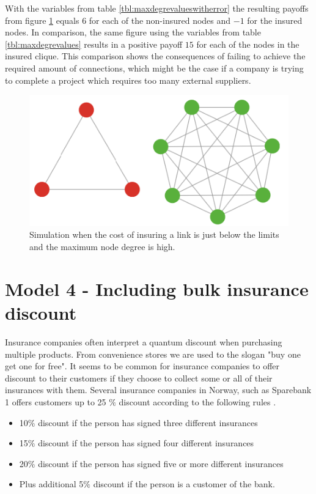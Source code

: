 With the variables from table \ref{tbl:maxdegrevalueswitherror} the resulting payoffs from figure \ref{fig:bonusviolatingWithErrors} equals $6$ for each of the non-insured nodes and $-1$ for the insured nodes. In comparison, the same figure using the variables from table \ref{tbl:maxdegrevalues} results in a positive payoff $15$ for each of the nodes in the insured clique. This comparison shows the consequences of failing to achieve the required amount of connections, which might be the case if a company is trying to complete a project which requires too many external suppliers. 

\begin{figure}[h]
\centering
  \includegraphics[width=0.6\linewidth]{../Figures/BonusGameInsuredCliqueWithErrors.png}
  \caption{\label{fig:bonusviolatingWithErrors} Simulation when the cost of insuring a link is just below the limits and the maximum node degree is high. }
\end{figure}

\section{Model 4 - Including bulk insurance discount}

Insurance companies often interpret a quantum discount when purchasing multiple products. From convenience stores we are used to the slogan "buy one get one for free". It seems to be common for insurance companies to offer discount to their customers if they choose to collect some or all of their insurances with them. Several insurance companies in Norway, such as Sparebank 1 offers customers up to 25 $\%$ discount according to the following rules \cite{sparebank1}. 

\begin{itemize}

\item 10$\%$ discount if the person has signed three different insurances
\item 15$\%$ discount if the person has signed four different insurances
\item 20$\%$ discount if the person has signed five or more different insurances
\item Plus additional 5$\%$ discount if the person is a customer of the bank. 

\end{itemize}

